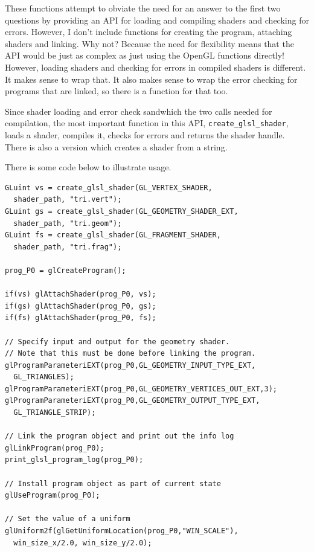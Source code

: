 \documentclass[a4paper]{article}
\begin{document}
These functions attempt to obviate the need for an answer to the first two questions by providing an API for loading and compiling shaders and checking for errors. However, I don't include functions for creating the program, attaching shaders and linking. Why not? Because the need for flexibility means that the API would be just as complex as just using the OpenGL functions directly! However, loading shaders and checking for errors in compiled shaders is different. It makes sense to wrap that. It also makes sense to wrap the error checking for programs that are linked, so there is a function for that too.

Since shader loading and error check sandwhich the two calls needed for compilation, the most important function in this API, \texttt{create\_glsl\_shader}, loads a shader, compiles it, checks for errors and returns the shader handle. There is also a version which creates a shader from a string.

There is some code below to illustrate usage.  
\begin{verbatim}
GLuint vs = create_glsl_shader(GL_VERTEX_SHADER, 
  shader_path, "tri.vert");
GLuint gs = create_glsl_shader(GL_GEOMETRY_SHADER_EXT, 
  shader_path, "tri.geom");
GLuint fs = create_glsl_shader(GL_FRAGMENT_SHADER, 
  shader_path, "tri.frag");

prog_P0 = glCreateProgram();

if(vs) glAttachShader(prog_P0, vs);
if(gs) glAttachShader(prog_P0, gs);
if(fs) glAttachShader(prog_P0, fs);

// Specify input and output for the geometry shader.
// Note that this must be done before linking the program.
glProgramParameteriEXT(prog_P0,GL_GEOMETRY_INPUT_TYPE_EXT,
  GL_TRIANGLES);
glProgramParameteriEXT(prog_P0,GL_GEOMETRY_VERTICES_OUT_EXT,3);
glProgramParameteriEXT(prog_P0,GL_GEOMETRY_OUTPUT_TYPE_EXT,
  GL_TRIANGLE_STRIP);

// Link the program object and print out the info log
glLinkProgram(prog_P0);
print_glsl_program_log(prog_P0);

// Install program object as part of current state
glUseProgram(prog_P0);

// Set the value of a uniform
glUniform2f(glGetUniformLocation(prog_P0,"WIN_SCALE"), 
  win_size_x/2.0, win_size_y/2.0);
\end{verbatim}
%
%
\end{document}
